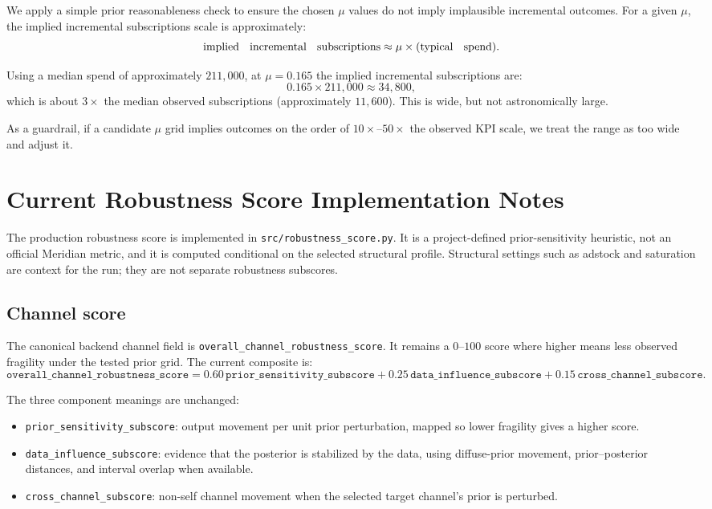 \documentclass{article}
\begin{document}
We apply a simple prior reasonableness check to ensure the chosen $\mu$ values do not imply implausible incremental outcomes. For a given $\mu$, the implied incremental subscriptions scale is approximately:
\[
\text{implied \; incremental \; subscriptions} \approx \mu \times (\text{typical \; spend}).
\]

Using a median spend of approximately $211{,}000$, at $\mu = 0.165$ the implied incremental subscriptions are:
\[
0.165 \times 211{,}000 \approx 34{,}800,
\]
which is about $3\times$ the median observed subscriptions (approximately $11{,}600$). This is wide, but not astronomically large.

As a guardrail, if a candidate $\mu$ grid implies outcomes on the order of $10\times$--$50\times$ the observed KPI scale, we treat the range as too wide and adjust it.

\section{Current Robustness Score Implementation Notes}

The production robustness score is implemented in \texttt{src/robustness\_score.py}.
It is a project-defined prior-sensitivity heuristic, not an official Meridian
metric, and it is computed conditional on the selected structural profile.
Structural settings such as adstock and saturation are context for the run; they
are not separate robustness subscores.

\subsection{Channel score}

The canonical backend channel field is
\texttt{overall\_channel\_robustness\_score}. It remains a $0$--$100$ score where
higher means less observed fragility under the tested prior grid. The current
composite is:
\[
\texttt{overall\_channel\_robustness\_score}
=
0.60\,\texttt{prior\_sensitivity\_subscore}
+0.25\,\texttt{data\_influence\_subscore}
+0.15\,\texttt{cross\_channel\_subscore}.
\]

The three component meanings are unchanged:
\begin{itemize}
  \item \texttt{prior\_sensitivity\_subscore}: output movement per unit prior
  perturbation, mapped so lower fragility gives a higher score.
  \item \texttt{data\_influence\_subscore}: evidence that the posterior is
  stabilized by the data, using diffuse-prior movement, prior--posterior
  distances, and interval overlap when available.
  \item \texttt{cross\_channel\_subscore}: non-self channel movement when the
  selected target channel's prior is perturbed.
\end{itemize}
\end{document}
